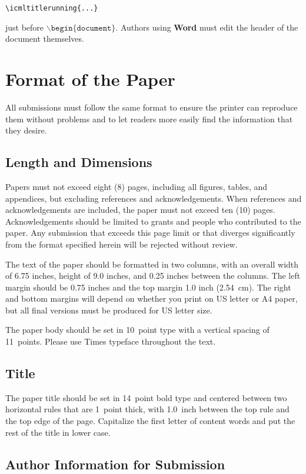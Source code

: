 \documentclass{article}
\begin{document}
\verb|\icmltitlerunning{...}|

just before $\mathtt{\backslash begin\{document\}}$.
Authors using \textbf{Word} must edit the header of the document themselves.

\section{Format of the Paper} 
 
All submissions must follow the same format to ensure the printer can
reproduce them without problems and to let readers more easily find
the information that they desire.

\subsection{Length and Dimensions}

Papers must not exceed eight (8) pages, including all figures, tables,
and appendices, but excluding references and acknowledgements. When references and acknowledgements are included,
the paper must not exceed ten (10) pages.
Acknowledgements should be limited to grants and people who contributed to the paper.
Any submission that exceeds 
this page limit or that diverges significantly from the format specified 
herein will be rejected without review.

The text of the paper should be formatted in two columns, with an
overall width of 6.75 inches, height of 9.0 inches, and 0.25 inches
between the columns. The left margin should be 0.75 inches and the top
margin 1.0 inch (2.54~cm). The right and bottom margins will depend on
whether you print on US letter or A4 paper, but all final versions
must be produced for US letter size.

The paper body should be set in 10~point type with a vertical spacing
of 11~points. Please use Times typeface throughout the text.

\subsection{Title}

The paper title should be set in 14~point bold type and centered
between two horizontal rules that are 1~point thick, with 1.0~inch
between the top rule and the top edge of the page. Capitalize the
first letter of content words and put the rest of the title in lower
case.

\subsection{Author Information for Submission}
\label{author info}
\end{document}
